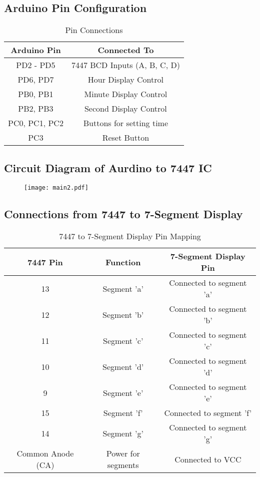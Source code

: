 \documentclass[journal,12pt,onecolumn,article]{IEEEtran}
\theoremstyle{remark}
\begin{document}
\subsection{Arduino Pin Configuration}

\begin{table}[h]
    \centering
    \begin{tabular}{|c|c|}
        \hline
        \textbf{Arduino Pin} & \textbf{Connected To} \\
        \hline
        PD2 - PD5 & 7447 BCD Inputs (A, B, C, D) \\
        PD6, PD7 & Hour Display Control \\
        PB0, PB1 & Minute Display Control \\
        PB2, PB3 & Second Display Control \\
        PC0, PC1, PC2 & Buttons for setting time \\
        PC3 & Reset Button \\
        \hline
    \end{tabular}
    \caption{Pin Connections}
    \label{tab:pin_connections}
\end{table}
\subsection*{Circuit Diagram of Aurdino to 7447 IC}
\begin{figure}[H]
	\centering
	\texttt{[image: main2.pdf]}
	\label{Figure 1}
\end{figure}
\subsection{Connections from 7447 to 7-Segment Display}

\begin{table}[H]
    \centering
    \renewcommand{\arraystretch}{1.2}
    \begin{tabular}{|c|c|c|}
        \hline
        \textbf{7447 Pin} & \textbf{Function} & \textbf{7-Segment Display Pin} \\
        \hline
        13 & Segment 'a' & Connected to segment 'a' \\
        12 & Segment 'b' & Connected to segment 'b' \\
        11 & Segment 'c' & Connected to segment 'c' \\
        10 & Segment 'd' & Connected to segment 'd' \\
        9  & Segment 'e' & Connected to segment 'e' \\
        15 & Segment 'f' & Connected to segment 'f' \\
        14 & Segment 'g' & Connected to segment 'g' \\
        \hline
        Common Anode (CA) & Power for segments & Connected to VCC \\
        \hline
    \end{tabular}
    \caption{7447 to 7-Segment Display Pin Mapping}
    \label{tab:7447_connections}
\end{table}
\end{document}
